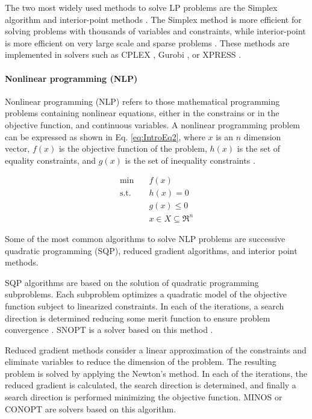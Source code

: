 \begin{refsection}[referencesCh1]
The two most widely used methods to solve LP problems are the Simplex algorithm
\citep{Dantzig1990}
and interior-point methods \citep{kantorovich1948newton, POTRA2000281}. The Simplex method is more efficient for solving problems with thousands of variables and constraints, while interior-point
is more efficient on very large scale and sparse problems \citep{grossmann2021advanced}. These methods are implemented in solvers such as CPLEX \citep{cplex2009v12}, Gurobi \citep{gurobi}, or XPRESS \citep{xpress}.

\paragraph{Nonlinear programming (NLP)}
Nonlinear programming (NLP) refers to those mathematical programming problems containing nonlinear equations, either in the constrains or in the objective function, and continuous variables. A nonlinear programming problem can be expressed as shown in Eq.  \ref{eq:IntroEq2}, where $x$ is an $n$ dimension vector, $f(x)$ is the objective function of the problem, $h(x)$ is the set of equality constraints, and $g(x)$ is the set of inequality constraints \citep{floudas1995nonlinear}.

\begin{align}
\label{eq:IntroEq2}
\min \quad & f(x) \nonumber\\
\textrm{s.t.} \quad & h(x)=0\\
& g(x) \leq 0 \nonumber\\
&x \in X  \subseteq \Re^{n} \nonumber
\end{align}

Some of the most common algorithms to solve NLP problems are successive quadratic programming (SQP), reduced gradient algorithms, and interior point methods. 

SQP algorithms are based on the solution of quadratic programming subproblems. Each subproblem optimizes a quadratic model of the objective function subject to linearized constraints. In each of the iterations, a search direction is determined reducing some merit function to ensure problem convergence \citep{gill2005snopt}. SNOPT is a solver based on this method \citep{gill2005snopt}.

Reduced gradient methods consider a linear approximation of the constraints and eliminate variables to reduce the dimension of the problem. The resulting problem is solved by applying the Newton’s method. In each of the iterations, the reduced gradient is calculated, the search direction is determined, and finally a search direction is performed minimizing the objective function. MINOS \citep{murtagh1983minos} or CONOPT \citep{drud1985conopt} are solvers based on this algorithm.


\end{refsection}
